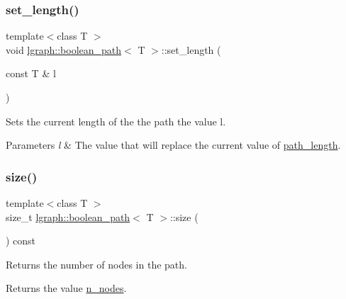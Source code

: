\subsubsection{\texorpdfstring{set\+\_\+length()}{set\_length()}}
{\footnotesize\ttfamily template$<$class T $>$ \\
void \hyperlink{classlgraph_1_1boolean__path}{lgraph\+::boolean\+\_\+path}$<$ T $>$\+::set\+\_\+length (\begin{DoxyParamCaption}\item[{const T \&}]{l }\end{DoxyParamCaption})}



Sets the current length of the the path the value l. 


\begin{DoxyParams}{Parameters}
{\em l} & The value that will replace the current value of \hyperlink{classlgraph_1_1boolean__path_ab298ac156fd7d73e21769fd30b2c5ad1}{path\+\_\+length}. \\
\hline
\end{DoxyParams}
\mbox{\label{classlgraph_1_1boolean__path_ac87119984b213d8f2f2d9bb2c40c7b8d}} 
\subsubsection{\texorpdfstring{size()}{size()}}
{\footnotesize\ttfamily template$<$class T $>$ \\
size\+\_\+t \hyperlink{classlgraph_1_1boolean__path}{lgraph\+::boolean\+\_\+path}$<$ T $>$\+::size (\begin{DoxyParamCaption}{ }\end{DoxyParamCaption}) const}



Returns the number of nodes in the path. 

Returns the value \hyperlink{classlgraph_1_1boolean__path_a98f07b983e0812fd283f16c3871793ef}{n\+\_\+nodes}. \mbox{\label{classlgraph_1_1boolean__path_a0e9a6c2a747b7b0c7ad0b7fcceefe7bf}} 
